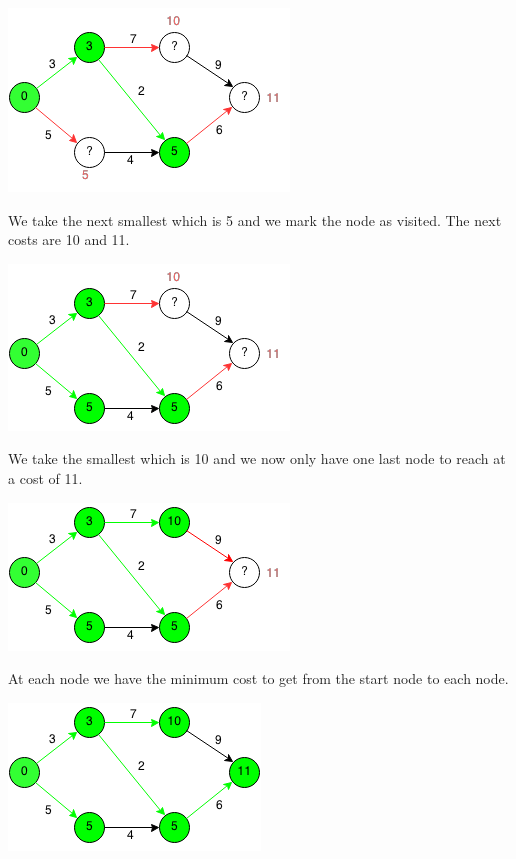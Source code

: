 \documentclass[11pt,oneside]{book}
\makeatletter
\def\maxwidth#1{\ifdim\Gin@nat@width>#1 #1\else\Gin@nat@width\fi}
\makeatother
\begin{document}
\vspace{5px}\includegraphics[width=\maxwidth{\textwidth}]{djikstra3.png}

We take the next smallest which is 5 and we mark the node as visited. The next costs are 10 and 11.

\vspace{5px}\includegraphics[width=\maxwidth{\textwidth}]{djikstra4.png}

We take the smallest which is 10 and we now only have one last node to reach at a cost of 11.

\vspace{5px}\includegraphics[width=\maxwidth{\textwidth}]{djikstra5.png}

At each node we have the minimum cost to get from the start node to each node.

\vspace{5px}\includegraphics[width=\maxwidth{\textwidth}]{djikstra6.png}
\end{document}
